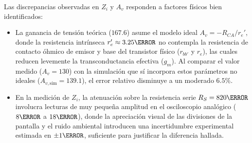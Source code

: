 Las discrepancias observadas en $Z_i$ y $A_v$ responden a factores físicos bien identificados:
\begin{itemize}
  \item La ganancia de tensión teórica ($167.6$) asume el modelo ideal $A_v = -R_{CA}/r_e'$, donde la resistencia
    intrínseca $r_e' \approx 3.25\ohm$ no contempla la resistencia de contacto óhmico de emisor y base del transistor
    físico ($r_{bb'}$ y $r_e$), las cuales reducen levemente la transconductancia efectiva ($g_m$). Al comparar el valor
    medido ($A_v = 130$) con la simulación que sí incorpora estos parámetros no ideales ($A_{v,\text{sim}} = 139.1$),
    el error relativo disminuye a un moderado $6.5\%$.
  \item En la medición de $Z_i$, la atenuación sobre la resistencia serie $R_S = 820\ohm$ involucra lecturas de muy
    pequeña amplitud en el osciloscopio analógico ($8\mV$ a $18\mV$), donde la apreciación visual de las divisiones de la
    pantalla y el ruido ambiental introducen una incertidumbre experimental estimada en $\pm 1\mV$, suficiente para
    justificar la diferencia hallada.
\end{itemize}
